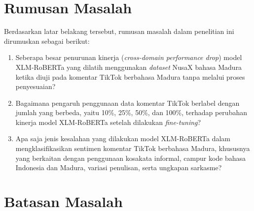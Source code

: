 \section{Rumusan Masalah}

Berdasarkan latar belakang tersebut, rumusan masalah dalam penelitian ini dirumuskan sebagai berikut:
\begin{enumerate}
    \item Seberapa besar penurunan kinerja (\textit{cross-domain performance drop}) model XLM-RoBERTa yang dilatih menggunakan \textit{dataset} NusaX bahasa Madura ketika diuji pada komentar TikTok berbahasa Madura tanpa melalui proses penyesuaian?
    \item Bagaimana pengaruh penggunaan data komentar TikTok berlabel dengan jumlah yang berbeda, yaitu 10\%, 25\%, 50\%, dan 100\%, terhadap perubahan kinerja model XLM-RoBERTa setelah dilakukan \textit{fine-tuning}?
    \item Apa saja jenis kesalahan yang dilakukan model XLM-RoBERTa dalam mengklasifikasikan sentimen komentar TikTok berbahasa Madura, khususnya yang berkaitan dengan penggunaan kosakata informal, campur kode bahasa Indonesia dan Madura, variasi penulisan, serta ungkapan sarkasme?
\end{enumerate}

\section{Batasan Masalah}

